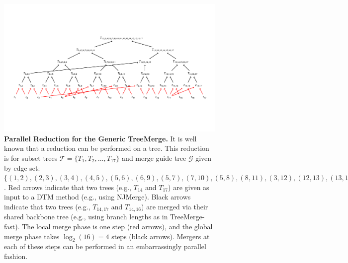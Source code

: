 \begin{landscape}
\begin{figure}
\centering
\includegraphics[scale=0.65]{figures/treemerge-fig1.pdf}
\captionsetup{singlelinecheck=off}
\caption[]{{\bf Parallel Reduction for the Generic TreeMerge.} 
It is well known that a reduction can be performed on a tree. This reduction is for subset trees $\mathcal{T} = \{T_1, T_2, \dots, T_{17} \}$ and merge guide tree $\mathcal{G}$ given by edge set: $\{(1,2), (2,3), (3,4), (4,5), (5,6), (6,9), (5,7), (7,10), (5,8), (8,11), (3,12), (12,13), (13, 14), (14, 15), (14, 16), (14, 17)\}$.
Red arrows indicate that two trees (e.g., $T_{14}$ and $T_{17}$) are given as input to a DTM method (e.g., using NJMerge). Black arrows indicate that two trees (e.g., $T_{14,17}$ and $T_{14,16}$) are merged via their shared backbone tree (e.g., using branch lengths as in TreeMerge-fast). The local merge phase is one step (red arrows), and the global merge phase takes $\log_2{(16)} = 4$ steps (black arrows). Mergers at each of these steps can be performed in an embarrassingly parallel fashion.}
\label{fig:reduction}
\end{figure}
\fillandplacepagenumber
\end{landscape}

